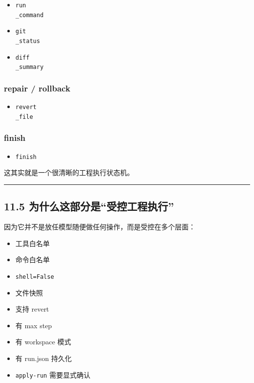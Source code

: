 \documentclass[UTF8,12pt,openany]{ctexbook}
\begin{document}
\begin{itemize}
\item \texttt{run\\_command}
\item \texttt{git\\_status}
\item \texttt{diff\\_summary}
\end{itemize}

\subsubsection{repair / rollback}

\begin{itemize}
\item \texttt{revert\\_file}
\end{itemize}

\subsubsection{finish}

\begin{itemize}
\item \texttt{finish}
\end{itemize}

这其实就是一个很清晰的工程执行状态机。\par

\hrule

\subsection{11.5 为什么这部分是“受控工程执行”}

因为它并不是放任模型随便做任何操作，而是受控在多个层面：\par

\begin{itemize}
\item 工具白名单
\item 命令白名单
\item \texttt{shell=False}
\item 文件快照
\item 支持 revert
\item 有 max step
\item 有 workspace 模式
\item 有 run.json 持久化
\item \texttt{apply-run} 需要显式确认
\end{itemize}
\end{document}
